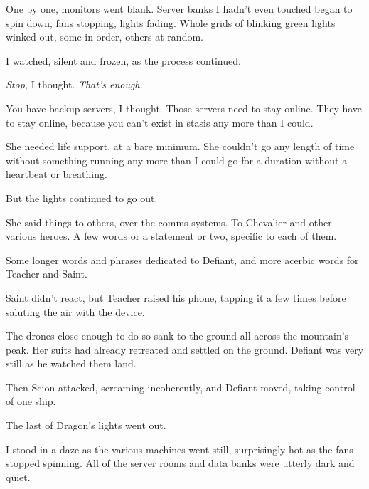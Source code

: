 One by one, monitors went blank.  Server banks I hadn't even touched began to spin down, fans stopping, lights fading.  Whole grids of blinking green lights winked out, some in order, others at random.



I watched, silent and frozen, as the process continued.



\emph{Stop,} I thought.  \emph{That's enough.}



You have backup servers, I thought.  Those servers need to stay online.  They have to stay online, because you can't exist in stasis any more than I could.



She needed life support, at a bare minimum.  She couldn't go any length of time without something running any more than I could go for a duration without a heartbeat or breathing.



But the lights continued to go out.



She said things to others, over the comms systems.  To Chevalier and other various heroes.  A few words or a statement or two, specific to each of them.



Some longer words and phrases dedicated to Defiant, and more acerbic words for Teacher and Saint.



Saint didn't react, but Teacher raised his phone, tapping it a few times before saluting the air with the device.



The drones close enough to do so sank to the ground all across the mountain's peak.  Her suits had already retreated and settled on the ground.  Defiant was very still as he watched them land.



Then Scion attacked, screaming incoherently, and Defiant moved, taking control of one ship.



The last of Dragon's lights went out.



I stood in a daze as the various machines went still, surprisingly hot as the fans stopped spinning.  All of the server rooms and data banks were utterly dark and quiet.



